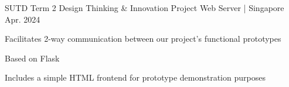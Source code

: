 \begin{cventries}

  \cventry
    {SUTD Term 2 Design Thinking \& Innovation Project} %
    {Web Server | } %
    {Singapore} %
    {Apr. 2024} %
    {
      \begin{cvitems} %
        \item {Facilitates 2-way communication between our project's functional prototypes}
        \item {Based on Flask}
        \item {Includes a simple HTML frontend for prototype demonstration purposes}
      \end{cvitems}
    }
  

\end{cventries}
